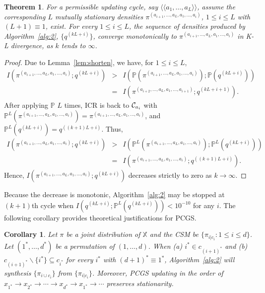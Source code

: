 \documentclass[12pt,a4paper]{article}
\newtheorem{theorem}[definition]{Theorem}
\newtheorem{corollary}[definition]{Corollary}
\begin{document}
\begin{theorem}\label{thm:convergence}
For a permissible updating cycle,
say $\langle \langle a_1,\ldots,a_L\rangle \rangle$, assume the corresponding
$L$ mutually stationary densities $\pi^{(a_{i+1},\ldots,a_L,a_1,\ldots,a_i)}$, $1 \le i \le L$
with $(L+1)\equiv 1$, exist.  For every $1 \le i \le L$,
the sequence of  densities produced by Algorithm~\ref{alg:2}, $\{q^{(kL+i)}\}$,
 converge monotonically to $\pi^{(a_{i+1},\ldots,a_L,a_1,\ldots,a_i)}$ in K-L divergence,
as $k$ tends to $\infty$.
\end{theorem}
\begin{proof}
Due to Lemma~\ref{lem:shorten}, we have, for $1 \le i \le L$,
\begin{eqnarray*}
I\left(\pi^{(a_{i+1},\ldots,a_L,a_1,\ldots,a_i)};q^{(kL+i)}\right)
 & >& I\left({\mathbb P}(\pi^{(a_{i+1},\ldots,a_L,a_1,\ldots,a_i)});{\mathbb P}(q^{(kL+i)})\right)\\
 &= & I\left(\pi^{(a_{i+2},\ldots,a_L,a_1,\ldots,a_{i+1})};q^{(kL+i+1)}\right).
\end{eqnarray*}
After applying ${\mathbb P}$ $L$ times, ICR is back
to ${\cal C}_{a_i}$ with
${\mathbb P}^L (\pi^{(a_{i+1},\ldots,a_L,a_1,\ldots,a_i)})
= \pi^{(a_{i+1},\ldots,a_L,a_1,\ldots,a_i)}$,
and ${\mathbb P}^L (q^{(kL+i)})= q^{((k+1)L+i)}$. Thus,
\begin{eqnarray*}
I\left(\pi^{(a_{i+1},\ldots,a_L,a_1,\ldots,a_i)};q^{(kL+i)}\right) &>&
I\left({\mathbb P}^L (\pi^{(a_{i+1},\ldots,a_L,a_1,\ldots,a_i)});{\mathbb P}^L (q^{(kL+i)})\right)\\
&=&
I\left(\pi^{(a_{i+1},\ldots,a_L,a_1,\ldots,a_i)};q^{((k+1)L+i)} \right).
\end{eqnarray*}
Hence,  $I\left(\pi^{(a_{i+1},\ldots,a_L,a_1,\ldots,a_i)};q^{(kL+i)}\right)$
decreases strictly to zero as $k \rightarrow\infty$.
\end{proof}

Because the decrease is monotonic,  Algorithm~\ref{alg:2} may be stopped at $(k+1)$th
cycle when $I\left( q^{(kL+i)}; {\mathbb P}^L (q^{(kL+i)})\right) < 10^{-10}$ for any $i$.
The following corollary provides  theoretical justifications for  PCGS.

\begin{corollary}
Let $\pi$ be a joint distribution of $\mathbb{X}$ and the CSM be
$\{\pi_{i|c_i}:1\leq i\leq d\}$.
Let $(1^{\ast},\ldots, d^{\ast})$ be a permutation of $(1,\ldots,d)$.
When {\rm (a)} $i^{\ast}\in c_{(i+1)^{\ast}}$
and {\rm (b)} $c_{(i+1)^{\ast}}\backslash \{i^{\ast}\}\subseteq c_{i^{\ast}}$
for every $i^{\ast}$ with $(d+1)^{\ast} \equiv 1^{\ast}$,
Algorithm~\ref{alg:2} will synthesis $\{\pi_{i\cup c_i}\}$ from $\{\pi_{i|c_i}\}$.
Moreover, PCGS updating in the order of
$x_{1^{\ast}}\to x_{2^{\ast}}\to\cdots\to x_{d^{\ast}}\to x_{1^{\ast}}\to\cdots$
preserves  stationarity.
\end{corollary}
\end{document}
